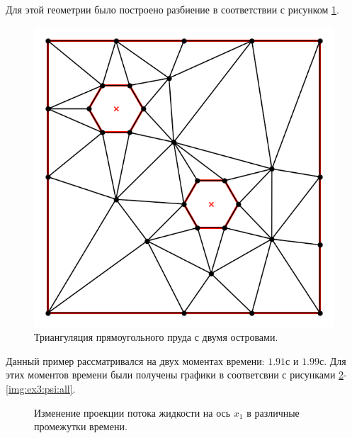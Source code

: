 \documentclass[14pt]{extreport}
\begin{document}
Для этой геометрии было построено разбиение в соответствии с рисунком \ref{img:ex3:mesh}.

\begin{figure}[H]
\centerline{
\includegraphics[width=0.5\linewidth]{images/ex3/mesh}}
\caption{Триангуляция прямоугольного пруда с двумя островами.}
\label{img:ex3:mesh}
\end{figure}

Данный пример рассматривался на двух моментах времени: $1.91$с и $1.99$с. Для этих моментов времени были получены графики в соответсвии с рисунками \ref{img:ex3:q1:all}-\ref{img:ex3:psi:all}.

\begin{figure}[H]
  \centering
  \hfill
  \caption{Изменение проекции потока жидкости на ось $x_1$ в различные промежутки времени.}
  \label{img:ex3:q1:all}
\end{figure}
\end{document}
